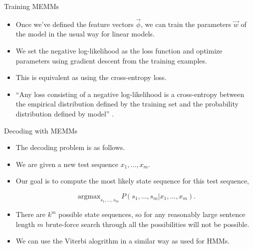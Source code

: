 \documentclass[handout]{beamer}
\begin{document}
\begin{frame}{Training MEMMs}
\begin{scriptsize}
\begin{itemize}

\item Once we've defined the feature vectors $\vec{\phi}$, we can train the parameters $\vec{w}$ of the model in the usual way for linear models.

\item We set the negative log-likelihood as the loss function and optimize parameters using gradient descent from the training examples.

\item This is equivalent as using the cross-entropy loss.

\item ``Any loss consisting of a negative log-likelihood is a cross-entropy between the empirical distribution defined by the training set and the probability distribution defined by model'' \cite{goodfellow2016deep}.  
 
\end{itemize}


\end{scriptsize}
\end{frame}




\begin{frame}{Decoding with MEMMs}
\begin{scriptsize}
\begin{itemize}

\item The decoding problem is as follows.
\item We are given a new test sequence $x_1, \dots, x_m$.
\item Our goal is to compute the most likely state sequence for this test sequence,

\begin{equation}
 \operatorname{argmax}_{s_1,\dots,s_m} P(s_1,\dots,s_m|x_1,\dots,x_m).
\end{equation}

\item There are $k^m$ possible state sequences, so for any reasonably large sentence length $m$ brute-force search through all the possibilities will not be possible.

\item We can use the Viterbi alogrithm in a similar way as used for HMMs.
 
\end{itemize}


\end{scriptsize}
\end{frame}
\end{document}
